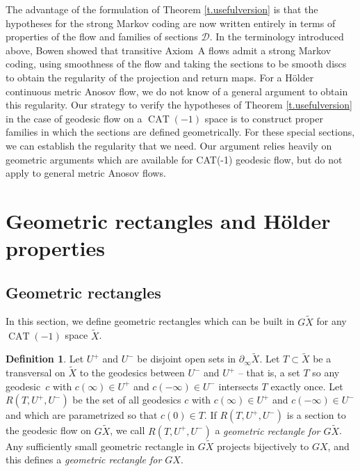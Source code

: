\documentclass[11pt]{article}
\let\mathcal\mathscr
\theoremstyle{definition}
\newtheorem{defn}[thm]{Definition}
\numberwithin{equation}{section}
\DeclareMathOperator{\CAT}{CAT}
\newcommand\DDD{\mathcal D}
\begin{document}
The advantage of the formulation of Theorem \ref{t.usefulversion} is that the hypotheses for the strong Markov coding are now written entirely in terms of properties of the flow and families of sections $\DDD$. In the terminology introduced above, Bowen showed that transitive Axiom~A flows admit a strong Markov coding, using smoothness of the flow and taking the sections to be smooth discs to obtain the regularity of the projection and return maps. For a Hölder continuous metric Anosov flow, we do not know of a general argument to obtain this regularity. Our strategy to verify the hypotheses of Theorem \ref{t.usefulversion} in the case of geodesic flow on a $\CAT(-1)$ space is to construct proper families in which the sections are defined geometrically. For these special sections, we can establish the regularity that we need. Our argument relies heavily on geometric arguments which are available for CAT(-1) geodesic flow, but do not apply to general metric Anosov flows.

\section{Geometric rectangles and Hölder properties}\label{sec:good rectangles}

\subsection{Geometric rectangles} \label{subsec:geom rect}

In this section, we define geometric rectangles which can be built in $G\tilde X$ for any $\CAT(-1)$ space $\tilde X$.

\begin{defn}\label{def:geom rectangle}
Let $U^+$ and $U^-$ be disjoint open sets in $\partial_\infty \tilde X$. Let $T \subset \tilde X$ be a transversal on $\tilde X$ to the geodesics between $U^-$ and $U^+$ -- that is, a set $T$ so any geodesic~$c$ with $c(\infty)\in U^+$ and $c(-\infty) \in U^-$ intersects $T$ exactly once. Let $R(T, U^+, U^-)$ be the set of all geodesics $c$ with $c(\infty)\in U^+$ and $c(-\infty) \in U^-$ and which are parametrized so that $c(0)\in T$. If $R(T,U^+,U^-)$ is a section to the geodesic flow on $G \tilde X$, we call $R(T,U^+,U^-)$ a \emph{geometric rectangle for $G\tilde X$}. Any sufficiently small geometric rectangle in $G\tilde X$ projects bijectively to $GX$, and this defines a \emph{geometric rectangle for $GX$}.
\end{defn}
\end{document}
